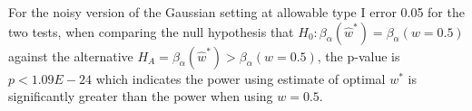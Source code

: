 \documentclass[11pt]{article} %
\begin{document}

For the noisy version of the Gaussian setting at allowable type I error 0.05 for the two tests, when comparing  the null hypothesis that  $H_{0}: \beta_{\alpha}({\hat{w}^*})=\beta_{\alpha}({w=0.5})$ against the alternative $H_{A}=\beta_{\alpha}({\hat{w}^*})>\beta_{\alpha}({w=0.5})$, the p-value is $p<1.09E-24$ which indicates the power using estimate of optimal $w^*$ is significantly greater than the power when using $w=0.5$. 
\end{document}
